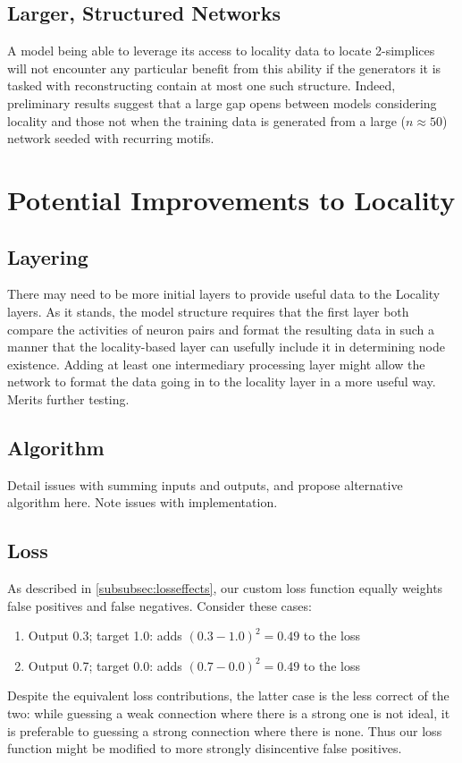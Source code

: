 \subsection{Larger, Structured Networks}
A model being able to leverage its access to locality data to locate 2-simplices 
will not encounter any particular benefit from this ability if the generators it 
is tasked with reconstructing contain at most one such structure. Indeed, 
preliminary results suggest that a large gap opens between models considering 
locality and those not when the training data is generated from a large 
($n\approx50$) network seeded with recurring motifs.

\section{Potential Improvements to Locality}

\subsection{Layering}
There may need to be more initial layers to provide useful data to the Locality 
layers.  As it stands, the model structure requires that the first layer both 
compare the activities of neuron pairs and format the resulting data in such a 
manner that the locality-based layer can usefully include it in determining node 
existence.  Adding at least one intermediary processing layer might allow the 
network to format the data going in to the locality layer in a more useful way.  
Merits further testing.

\subsection{Algorithm}
Detail issues with summing inputs and outputs, and propose alternative algorithm 
here. Note issues with implementation.

\subsection{Loss}
As described in \ref{subsubsec:losseffects}, our custom loss function equally 
weights false positives and false negatives. Consider these cases:

\begin{enumerate}
	\item Output 0.3; target 1.0: adds $(0.3-1.0)^2=0.49$ to the loss
	\item Output 0.7; target 0.0: adds $(0.7-0.0)^2=0.49$ to the loss
\end{enumerate}
Despite the equivalent loss contributions, the latter case is the less correct 
of the two: while guessing a weak connection where there is a strong one is not 
ideal, it is preferable to guessing a strong connection where there is none.  
Thus our loss function might be modified to more strongly disincentive false 
positives.

